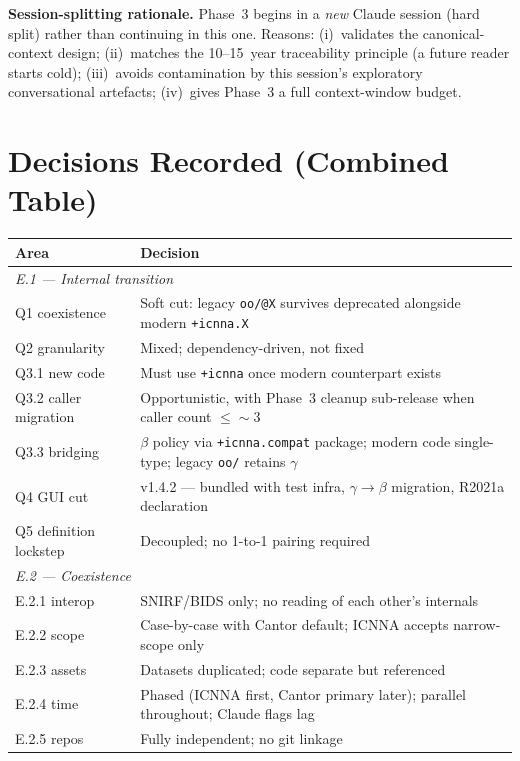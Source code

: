 \documentclass[11pt,a4paper]{article}
\begin{document}
\textbf{Session-splitting rationale.} Phase~3 begins in a \emph{new} Claude session (hard split) rather than continuing in this one. Reasons: (i)~validates the canonical-context design; (ii)~matches the 10--15~year traceability principle (a future reader starts cold); (iii)~avoids contamination by this session's exploratory conversational artefacts; (iv)~gives Phase~3 a full context-window budget.

\section{Decisions Recorded (Combined Table)}

\begin{longtable}{p{3cm}p{11cm}}
\toprule
\textbf{Area} & \textbf{Decision} \\
\midrule
\endhead
\multicolumn{2}{l}{\textit{E.1 --- Internal transition}} \\
\midrule
Q1 coexistence & Soft cut: legacy \texttt{oo/@X} survives deprecated alongside modern \texttt{+icnna.X} \\
Q2 granularity & Mixed; dependency-driven, not fixed \\
Q3.1 new code & Must use \texttt{+icnna} once modern counterpart exists \\
Q3.2 caller migration & Opportunistic, with Phase~3 cleanup sub-release when caller count $\leq \sim 3$ \\
Q3.3 bridging & $\beta$ policy via \texttt{+icnna.compat} package; modern code single-type; legacy \texttt{oo/} retains $\gamma$ \\
Q4 GUI cut & v1.4.2 --- bundled with test infra, $\gamma\to\beta$ migration, R2021a declaration \\
Q5 definition lockstep & Decoupled; no 1-to-1 pairing required \\
\midrule
\multicolumn{2}{l}{\textit{E.2 --- Coexistence}} \\
\midrule
E.2.1 interop & SNIRF/BIDS only; no reading of each other's internals \\
E.2.2 scope & Case-by-case with Cantor default; ICNNA accepts narrow-scope only \\
E.2.3 assets & Datasets duplicated; code separate but referenced \\
E.2.4 time & Phased (ICNNA first, Cantor primary later); parallel throughout; Claude flags lag \\
E.2.5 repos & Fully independent; no git linkage \\

\end{longtable}
\end{document}
